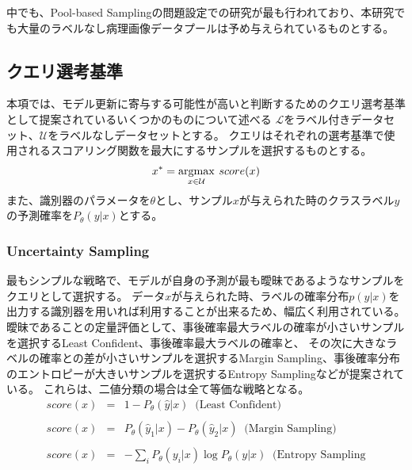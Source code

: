 中でも、Pool-based Samplingの問題設定での研究が最も行われており、本研究でも大量のラベルなし病理画像データプールは予め与えられているものとする。

\subsection{クエリ選考基準}
\label{query_strategy}
本項では、モデル更新に寄与する可能性が高いと判断するためのクエリ選考基準として提案されているいくつかのものについて述べる
$\mathcal{L}$をラベル付きデータセット、$\mathcal{U}$をラベルなしデータセットとする。
クエリはそれぞれの選考基準で使用されるスコアリング関数を最大にするサンプルを選択するものとする。
\begin{eqnarray}
    x^{*} = \argmax_{x \in \mathcal{U}} \: score(x)
\end{eqnarray}
また、識別器のパラメータを$\theta$とし、サンプル$x$が与えられた時のクラスラベル$y$の予測確率を$P_{\theta}(y|x)$とする。

\subsubsection{Uncertainty Sampling}
最もシンプルな戦略で、モデルが自身の予測が最も曖昧であるようなサンプルをクエリとして選択する。
データ$x$が与えられた時、ラベルの確率分布$p(y|x)$を出力する識別器を用いれば利用することが出来るため、幅広く利用されている。
曖昧であることの定量評価として、事後確率最大ラベルの確率が小さいサンプルを選択するLeast Confident、事後確率最大ラベルの確率と、
その次に大きなラベルの確率との差が小さいサンプルを選択するMargin Sampling、事後確率分布のエントロピーが大きいサンプルを選択するEntropy Samplingなどが提案されている。
これらは、二値分類の場合は全て等価な戦略となる。
\begin{eqnarray}
    score(x) &=& 1 - P_{\theta}(\hat{y}|x)  \;\; \mbox{(Least Confident)} \\ \nonumber \\ 
    score(x) &=& P_{\theta}(\hat{y}_1|x) - P_{\theta}(\hat{y}_2|x)  \;\; \mbox{(Margin Sampling)} \\ \nonumber \\
    score(x) &=& - \sum_i {P_{\theta}(y_i|x)} \log P_{\theta}(y|x)  \;\; \mbox{(Entropy Sampling}
\end{eqnarray}

